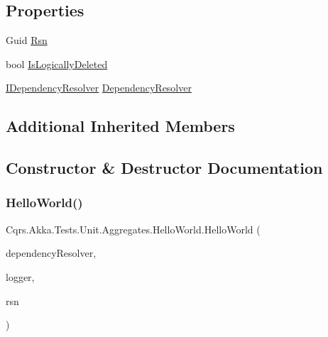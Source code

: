 \subsection*{Properties}
\begin{DoxyCompactItemize}
\item 
Guid \hyperlink{classCqrs_1_1Akka_1_1Tests_1_1Unit_1_1Aggregates_1_1HelloWorld_a2e74fa47e00d67d6de3df5b1b8e140f6}{Rsn}
\item 
bool \hyperlink{classCqrs_1_1Akka_1_1Tests_1_1Unit_1_1Aggregates_1_1HelloWorld_acd17d8097c0cb44400e876a53b4fbd57}{Is\+Logically\+Deleted}
\item 
\hyperlink{interfaceCqrs_1_1Configuration_1_1IDependencyResolver}{I\+Dependency\+Resolver} \hyperlink{classCqrs_1_1Akka_1_1Tests_1_1Unit_1_1Aggregates_1_1HelloWorld_abf66c1d14c78b9ed3ca54225d04a8beb}{Dependency\+Resolver}
\end{DoxyCompactItemize}
\subsection*{Additional Inherited Members}


\subsection{Constructor \& Destructor Documentation}
\mbox{\label{classCqrs_1_1Akka_1_1Tests_1_1Unit_1_1Aggregates_1_1HelloWorld_a54c9de656ea141ad532d55ba33e94a56}} 
\subsubsection{\texorpdfstring{Hello\+World()}{HelloWorld()}}
{\footnotesize\ttfamily Cqrs.\+Akka.\+Tests.\+Unit.\+Aggregates.\+Hello\+World.\+Hello\+World (\begin{DoxyParamCaption}\item[{\hyperlink{interfaceCqrs_1_1Configuration_1_1IDependencyResolver}{I\+Dependency\+Resolver}}]{dependency\+Resolver,  }\item[{I\+Logger}]{logger,  }\item[{Guid}]{rsn }\end{DoxyParamCaption})}



